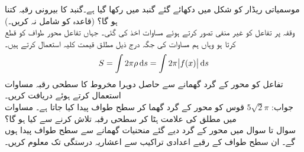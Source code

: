 موسمیاتی ریڈار کو شکل  میں دکھائے گئے  گنبد میں رکھا گیا ہے۔گنبد کا بیرونی رقبہ کتنا ہو گا؟ (قاعدہ کو شامل نہ کریں۔)
\\
وقفہ  پر تفاعل  کو غیر منفی تصور کرتے ہوئے  مساوات  اخذ کی گئی۔ جہاں تفاعل محور طواف کو قطع کرتا ہو وہاں ہم مساوات  کی جگہ درج ذیل مطلق قیمت کلیہ استعمال کرتے ہیں۔
\begin{align}\label{مساوات_تکمل_استعمال_سطحی_رقبہ_ٹ}
S=\int 2\pi \rho \dif s=\int 2\pi \abs{f(x)}\dif s
\end{align}
تفاعل   کو محور  کے گرد گھمانے سے حاصل دوہرا مخروط کا سطحی رقبہ مساوات  استعمال کرتے ہوئے  دریافت کریں۔\\
جواب:\quad
$5\sqrt{2}\pi$
قوس  کو محور  کے گرد گھما کر سطح طواف پیدا کیا جاتا ہے۔ مساوات  میں مطلق کی علامت ہٹا کر سطحی رقبہ تلاش کرنے سے کیا ہو گا؟
\\
سوال  تا سوال  میں محور  کے گرد دیے گئے منحنیات گھمانے سے سطح طواف پیدا ہوں گے۔ ان سطح طواف کے رقبے اعدادی تراکیب سے  اعشاریہ درستگی تک معلوم کریں۔

